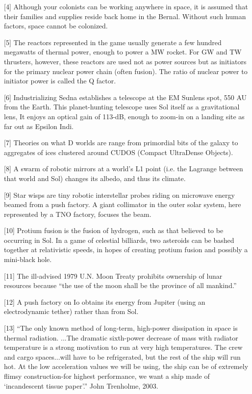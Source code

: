 \documentclass[a4paper]{book}
\begin{document}
[4] Although your colonists can be working anywhere in space, it is assumed that their families and supplies reside back home in the Bernal. Without such human factors, space cannot be colonized.
 
[5] The reactors represented in the game usually generate a few hundred megawatts of thermal power, enough to power a MW rocket. For GW and TW thrusters, however, these reactors are used not as power sources but as initiators for the primary nuclear power chain (often fusion). The ratio of nuclear power to initiator power is called the Q factor.
 
[6] Industrializing Sedna establishes a telescope at the EM Sunlens spot, 550 AU from the Earth. This planet-hunting telescope uses Sol itself as a gravitational lens, It enjoys an optical gain of 113-dB, enough to zoom-in on a landing site as far out as Epsilon Indi.
 
[7] Theories on what D worlds are range from primordial bits of the galaxy to aggregates of ices clustered around CUDOS (Compact UltraDense Objects).
 
[8] A swarm of robotic mirrors at a world’s L1 point (i.e. the Lagrange between that world and Sol) changes its albedo, and thus its climate.
 
[9] Star wisps are tiny robotic interstellar probes riding on microwave energy beamed from a push factory. A giant collimator in the outer solar system, here represented by a TNO factory, focuses the beam.
 
[10] Protium fusion is the fusion of hydrogen, such as that believed to be occurring in Sol. In a game of celestial billiards, two asteroids can be bashed together at relativistic speeds, in hopes of creating protium fusion and possibly a mini-black hole.
 
[11] The ill-advised 1979 U.N. Moon Treaty prohibits ownership of lunar resources because “the use of the moon shall be the province of all mankind.”
 
[12] A push factory on Io obtains its energy from Jupiter (using an electrodynamic tether) rather than from Sol.
 
[13] “The only known method of long-term, high-power dissipation in space is thermal radiation. ...The dramatic sixth-power decrease of mass with radiator temperature is a strong motivation to run at very high temperatures. The crew and cargo spaces...will have to be refrigerated, but the rest of the ship will run hot. At the low acceleration values we will be using, the ship can be of extremely flimsy construction-for highest performance, we want a ship made of ‘incandescent tissue paper’.” John Trenholme, 2003.
\end{document}
